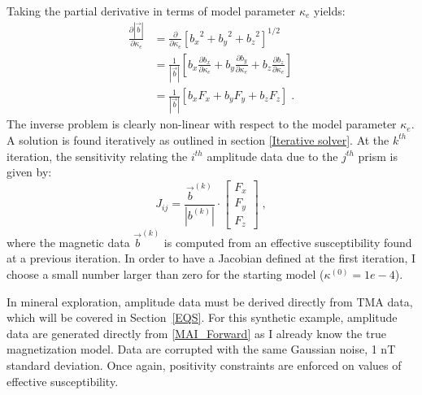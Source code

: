 Taking the partial derivative in terms of model parameter $\kappa_e$ yields:
\begin{equation}\label{dlBl_dm_derive}
	\begin{split}
\frac{\partial {|\vec b|}}{\partial  \kappa_e} &= 
	\frac{\partial}{\partial \kappa_e} {\left[  {b_x}^2 + {b_y}^2 + {b_z}^2 \right]}^{1/2} \\
	&= \frac{1}{{|\vec b|}} \left[ {{b_x} \frac{\partial{b_x}}{\partial \kappa_e} + {b_y}\frac{\partial{b_y}}{\partial \kappa_e} + {b_z}\frac{\partial{b_z}}{\partial \kappa_e}} \right] \\
&= \frac{1}{{|\vec b|}} \left[ {{b_x} {F}_x + {b_y}{F}_y + {b_z}{F}_z} \right] \;.
	\end{split}
\end{equation}
The inverse problem is clearly non-linear with respect to the model parameter $\kappa_e$.
A solution is found iteratively as outlined in section \ref{Iterative solver}.
At the $k^{th}$ iteration, the sensitivity relating the $i^{th}$ amplitude data due to the $j^{th}$ prism is given by:
\begin{equation}\label{dlBl_dm_kth}
{J}_{ij} = \frac{\vec b^{(k)}}{{|b^{(k)}|}} \cdot 
\begin{bmatrix}
{F}_x \\
{F}_y \\ 
{F}_z
\end{bmatrix}\;,
\end{equation}
where the magnetic data $\vec b^{(k)}$ is computed from an effective susceptibility found at a previous iteration.
In order to have a Jacobian defined at the first iteration, I choose a small number larger than zero for the starting model ($\kappa^{(0)}=1e-4$).

In mineral exploration, amplitude data must be derived directly from TMA data, which will be covered in Section~\ref{EQS}.
For this synthetic example, amplitude data are generated directly from \ref{MAI_Forward} as I already know the true magnetization model.
Data are corrupted with the same Gaussian noise, 1 nT standard deviation.
Once again, positivity constraints  are enforced on values of effective susceptibility.

